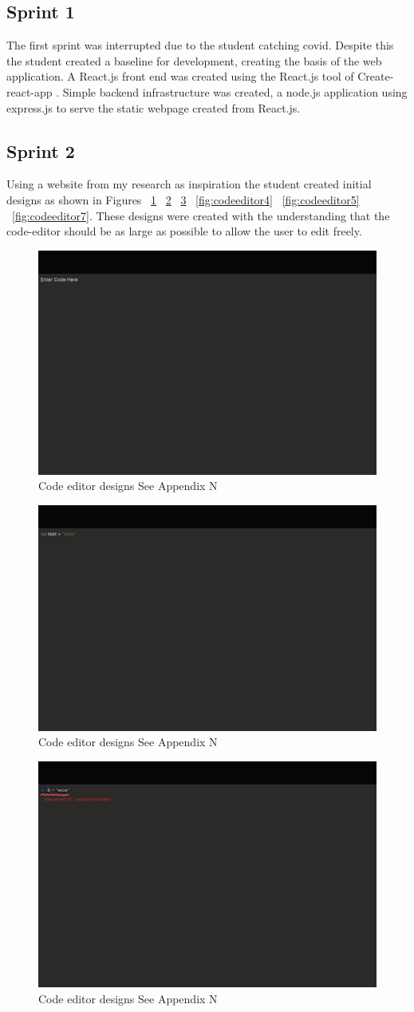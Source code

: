 \subsection{Sprint 1}
The first sprint was interrupted due to the student catching covid. Despite this the student created a baseline for development, creating the basis of the
web application. A React.js\cite{react} front end was created using the React.js tool of Create-react-app \cite{createReactApp}. Simple backend infrastructure was
created, a node.js\cite{node.js} application using express.js\cite{express} to serve the static webpage created from React.js.
\subsection{Sprint 2}
Using a website from my research \cite{astexplorer} as inspiration the student created initial designs as shown in Figures
~\ref{fig:codeeditor1} ~\ref{fig:codeeditor2} ~\ref{fig:codeeditor3} ~\ref{fig:codeeditor4} ~\ref{fig:codeeditor5}
~\ref{fig:codeeditor7}.
These designs were created with the understanding that the code-editor should be as large as possible to allow
the user to edit freely.
\begin{figure}
    \includegraphics[width=.4\textwidth]{appendix/N/code-editor1.png}
    \caption{Code editor designs See Appendix N}
    \label{fig:codeeditor1}
\end{figure}
\begin{figure}
    \includegraphics[width=.4\textwidth]{appendix/N/code-editor2.png}
    \caption{Code editor designs See Appendix N}
    \label{fig:codeeditor2}
\end{figure}
\begin{figure}
    \includegraphics[width=.4\textwidth]{appendix/N/code-editor3.png}
    \caption{Code editor designs See Appendix N}
    \label{fig:codeeditor3}
\end{figure}
